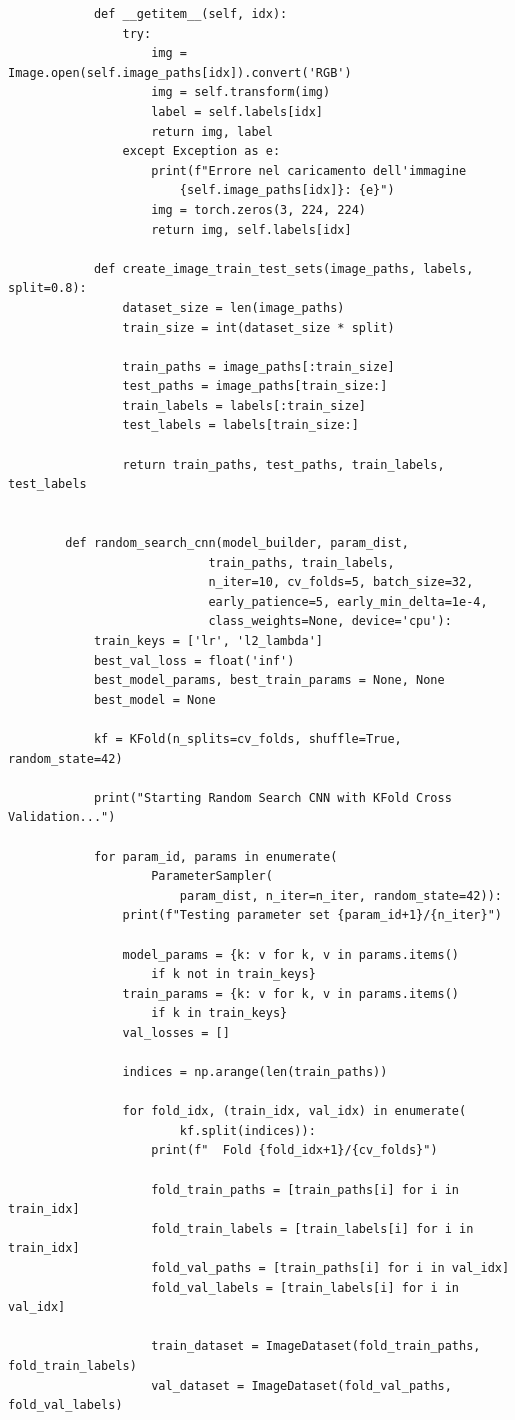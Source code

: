 \documentclass[a4paper,12pt]{report}
\begin{document}
\begin{verbatim}
			def __getitem__(self, idx):
				try:
					img = Image.open(self.image_paths[idx]).convert('RGB')
					img = self.transform(img)
					label = self.labels[idx]
					return img, label
				except Exception as e:
					print(f"Errore nel caricamento dell'immagine 
						{self.image_paths[idx]}: {e}")
					img = torch.zeros(3, 224, 224)
					return img, self.labels[idx]
			
			def create_image_train_test_sets(image_paths, labels, split=0.8):
				dataset_size = len(image_paths)
				train_size = int(dataset_size * split)
				
				train_paths = image_paths[:train_size]
				test_paths = image_paths[train_size:]
				train_labels = labels[:train_size]
				test_labels = labels[train_size:]
				
				return train_paths, test_paths, train_labels, test_labels
			
		
		def random_search_cnn(model_builder, param_dist,
							train_paths, train_labels,
							n_iter=10, cv_folds=5, batch_size=32,
							early_patience=5, early_min_delta=1e-4,
							class_weights=None, device='cpu'):
			train_keys = ['lr', 'l2_lambda']
			best_val_loss = float('inf')
			best_model_params, best_train_params = None, None
			best_model = None
			
			kf = KFold(n_splits=cv_folds, shuffle=True, random_state=42)
			
			print("Starting Random Search CNN with KFold Cross Validation...")
			
			for param_id, params in enumerate(
					ParameterSampler(
						param_dist, n_iter=n_iter, random_state=42)):
				print(f"Testing parameter set {param_id+1}/{n_iter}")
				
				model_params = {k: v for k, v in params.items() 
					if k not in train_keys}
				train_params = {k: v for k, v in params.items() 
					if k in train_keys}
				val_losses = []
				
				indices = np.arange(len(train_paths))
				
				for fold_idx, (train_idx, val_idx) in enumerate(
						kf.split(indices)):
					print(f"  Fold {fold_idx+1}/{cv_folds}")
					
					fold_train_paths = [train_paths[i] for i in train_idx]
					fold_train_labels = [train_labels[i] for i in train_idx]
					fold_val_paths = [train_paths[i] for i in val_idx]
					fold_val_labels = [train_labels[i] for i in val_idx]
					
					train_dataset = ImageDataset(fold_train_paths, fold_train_labels)
					val_dataset = ImageDataset(fold_val_paths, fold_val_labels)
					

\end{verbatim}
\end{document}
